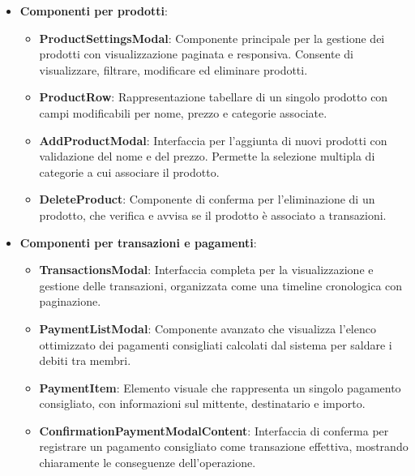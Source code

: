 \documentclass[11pt]{article}
\begin{document}
\begin{itemize}
    \item \textbf{Componenti per prodotti}:
    \begin{itemize}
        \item \textbf{ProductSettingsModal}: Componente principale per la gestione dei prodotti con visualizzazione paginata e responsiva. Consente di visualizzare, filtrare, modificare ed eliminare prodotti.
        \item \textbf{ProductRow}: Rappresentazione tabellare di un singolo prodotto con campi modificabili per nome, prezzo e categorie associate.
        \item \textbf{AddProductModal}: Interfaccia per l'aggiunta di nuovi prodotti con validazione del nome e del prezzo. Permette la selezione multipla di categorie a cui associare il prodotto.
        \item \textbf{DeleteProduct}: Componente di conferma per l'eliminazione di un prodotto, che verifica e avvisa se il prodotto è associato a transazioni.
    \end{itemize}

    \item \textbf{Componenti per transazioni e pagamenti}:
    \begin{itemize}
        \item \textbf{TransactionsModal}: Interfaccia completa per la visualizzazione e gestione delle transazioni, organizzata come una timeline cronologica con paginazione.
        \item \textbf{PaymentListModal}: Componente avanzato che visualizza l'elenco ottimizzato dei pagamenti consigliati calcolati dal sistema per saldare i debiti tra membri.
        \item \textbf{PaymentItem}: Elemento visuale che rappresenta un singolo pagamento consigliato, con informazioni sul mittente, destinatario e importo.
        \item \textbf{ConfirmationPaymentModalContent}: Interfaccia di conferma per registrare un pagamento consigliato come transazione effettiva, mostrando chiaramente le conseguenze dell'operazione.
    \end{itemize}
\end{itemize}
\end{document}
